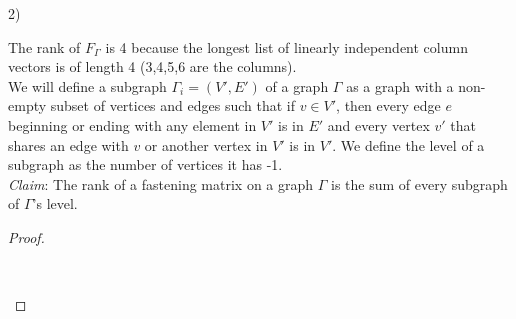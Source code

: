 \documentclass[11pt]{article}
\newenvironment{myproof}
{\begin{proof} \begin{adjustwidth}{3em}{0pt}$ $\par\nobreak\ignorespaces}
{\end{adjustwidth} \end{proof}}
\begin{document}
\begin{flushleft}
2)

The rank of $F_\Gamma$ is 4 because the longest list of linearly independent column vectors is of length 4 (3,4,5,6 are the columns). \\
\bigskip
We will define a subgraph $\Gamma_i = (V', E')$ of a graph $\Gamma$ as a graph with a non-empty subset of vertices and edges such that if $v \in V'$, then every edge $e$ beginning or ending with any element in $V'$ is in $E'$ and every vertex $v'$ that shares an edge with $v$ or another vertex in $V'$ is in $V'$. We define the level of a subgraph as the number of vertices it has -1. \\
\bigskip
\textit{Claim}: The rank of a fastening matrix on a graph $\Gamma$ is the sum of every subgraph of $\Gamma$'s level.

\begin{myproof}


\end{myproof}
\end{flushleft}
\end{document}
